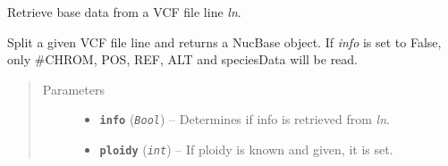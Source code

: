 \documentclass[letterpaper,10pt,english]{sphinxmanual}
\begin{document}
\begin{fulllineitems}
\label{vcf:libPoMo.vcf.get_nuc_base_from_line}
Retrieve base data from a VCF file line \emph{ln}.

Split a given VCF file line and returns a NucBase object. If
\emph{info} is set to False, only \#CHROM, POS, REF, ALT and speciesData will
be read.
\begin{quote}\begin{description}
\item[{Parameters}] \leavevmode\begin{itemize}
\item {} 
\textbf{\texttt{info}} (\emph{\texttt{Bool}}) -- Determines if info is retrieved from \emph{ln}.

\item {} 
\textbf{\texttt{ploidy}} (\emph{\texttt{int}}) -- If ploidy is known and given, it is set.

\end{itemize}

\end{description}\end{quote}

\end{fulllineitems}

\end{document}

